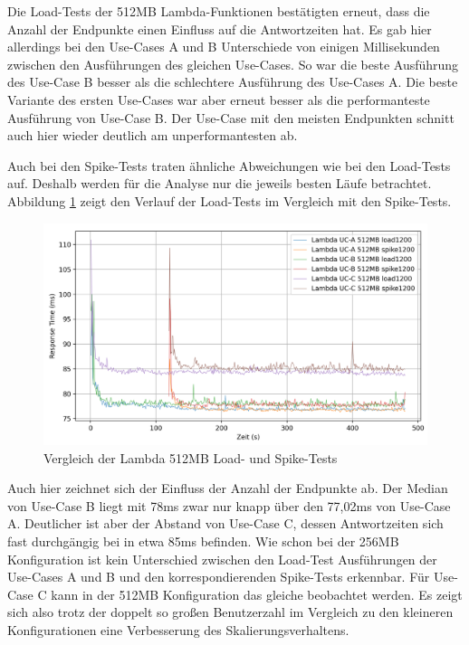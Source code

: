 Die Load-Tests der 512MB Lambda-Funktionen bestätigten erneut, dass die Anzahl der Endpunkte einen Einfluss auf die Antwortzeiten hat. Es gab hier allerdings bei den Use-Cases A und B Unterschiede von einigen Millisekunden zwischen den Ausführungen des gleichen Use-Cases. So war die beste Ausführung des Use-Case B besser als die schlechtere Ausführung des Use-Cases A. Die beste Variante des ersten Use-Cases war aber erneut besser als die performanteste Ausführung von Use-Case B. Der Use-Case mit den meisten Endpunkten schnitt auch hier wieder deutlich am unperformantesten ab.

Auch bei den Spike-Tests traten ähnliche Abweichungen wie bei den Load-Tests auf. Deshalb werden für die Analyse nur die jeweils besten Läufe betrachtet. Abbildung \ref{fig:lambda512-load1200-vs-spike1200-graph} zeigt den Verlauf der Load-Tests im Vergleich mit den Spike-Tests. 

\begin{figure}[H]
    \includegraphics[width=\textwidth]{img/lambda512-load1200-vs-spike1200-graph.png}
    \caption[Vergleich der Lambda 512MB Load- und Spike-Tests]{Vergleich der Lambda 512MB Load- und Spike-Tests}
    \label{fig:lambda512-load1200-vs-spike1200-graph}
\end{figure}

Auch hier zeichnet sich der Einfluss der Anzahl der Endpunkte ab. Der Median von Use-Case B liegt mit 78ms zwar nur knapp über den 77,02ms von Use-Case A. Deutlicher ist aber der Abstand von Use-Case C, dessen Antwortzeiten sich fast durchgängig bei in etwa 85ms befinden. 
Wie schon bei der 256MB Konfiguration ist kein Unterschied zwischen den Load-Test Ausführungen der Use-Cases A und B und den korrespondierenden Spike-Tests erkennbar. Für Use-Case C kann in der 512MB Konfiguration das gleiche beobachtet werden. Es zeigt sich also trotz der doppelt so großen Benutzerzahl im Vergleich zu den kleineren Konfigurationen eine Verbesserung des Skalierungsverhaltens.  

